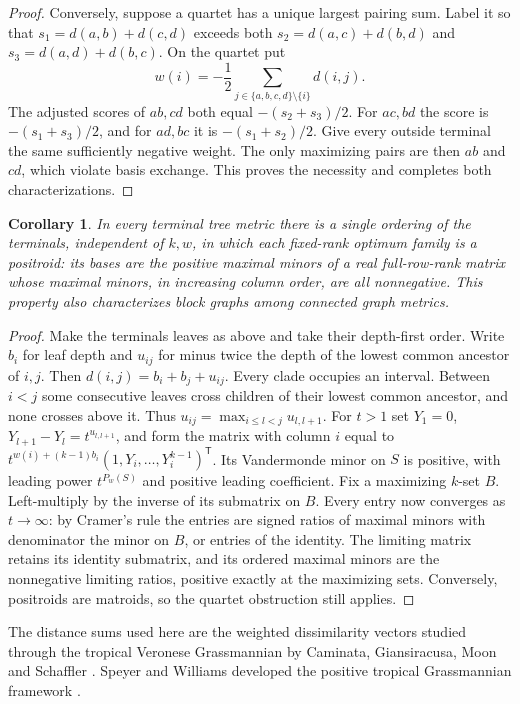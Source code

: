 \documentclass[11pt,a4paper]{article}
\newtheorem{corollary}[theorem]{Corollary}
\begin{document}
\begin{proof}
Conversely, suppose a quartet has a unique largest pairing sum. Label it
so that $s_1=d(a,b)+d(c,d)$ exceeds both $s_2=d(a,c)+d(b,d)$ and
$s_3=d(a,d)+d(b,c)$. On the quartet put
\[
 w(i)=-\frac12\sum_{j\in\{a,b,c,d\}\setminus\{i\}}d(i,j).
\]
The adjusted scores of $ab,cd$ both equal $-(s_2+s_3)/2$. For $ac,bd$
the score is $-(s_1+s_3)/2$, and for $ad,bc$ it is $-(s_1+s_2)/2$.
Give every outside terminal the same sufficiently negative weight.
The only maximizing pairs are then $ab$ and $cd$, which violate basis
exchange. This proves the necessity and completes both characterizations.
\end{proof}

\begin{corollary}\label{cor:block-positroid}
In every terminal tree metric there is a single ordering of the terminals,
independent of $k,w$, in which each fixed-rank optimum family is a
\emph{positroid}: its bases are the positive maximal minors of a real
full-row-rank matrix whose maximal minors, in increasing column order,
are all nonnegative. This property also characterizes block graphs among
connected graph metrics.
\end{corollary}
\begin{proof}
Make the terminals leaves as above and take their depth-first order.
Write $b_i$ for leaf depth and $u_{ij}$ for minus twice the depth of the
lowest common ancestor of $i,j$. Then $d(i,j)=b_i+b_j+u_{ij}$.
Every clade occupies an interval. Between $i<j$ some consecutive leaves
cross children of their lowest common ancestor, and none crosses above it.
Thus $u_{ij}=\max_{i\le l<j}u_{l,l+1}$. For $t>1$ set
$Y_1=0$, $Y_{l+1}-Y_l=t^{u_{l,l+1}}$, and form the matrix with column
$i$ equal to $t^{w(i)+(k-1)b_i}(1,Y_i,\ldots,Y_i^{k-1})^{\mathsf T}$.
Its Vandermonde minor on $S$ is positive, with leading power
$t^{P_w(S)}$ and positive leading coefficient. Fix a maximizing
$k$-set $B$. Left-multiply by the inverse of its submatrix on $B$.
Every entry now converges as $t\to\infty$: by Cramer's rule the entries
are signed ratios of maximal minors with denominator the minor on $B$,
or entries of the identity. The limiting matrix retains its identity
submatrix, and its ordered maximal minors are the nonnegative limiting
ratios, positive exactly at the maximizing sets. Conversely, positroids
are matroids, so the quartet obstruction still applies.
\end{proof}
The distance sums used here are the weighted dissimilarity vectors
studied through the tropical Veronese Grassmannian by Caminata,
Giansiracusa, Moon and Schaffler \cite{blockcgms}. Speyer and Williams
developed the positive tropical Grassmannian framework \cite{blocksw}.
\end{document}
